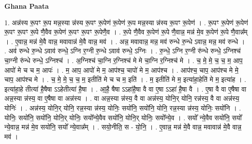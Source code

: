 \documentclass[17pt]{extarticle}
\begin{document}
\textbf{Ghana Paata } \newline

1. अन्न॑स्य रू॒पꣳ रू॒प मन्न॒स्या न्न॑स्य रू॒पꣳ रू॒पेण॑ रू॒पेण॑ रू॒प मन्न॒स्या न्न॑स्य रू॒पꣳ रू॒पेण॑ । . रू॒पꣳ रू॒पेण॑ रू॒पेण॑ रू॒पꣳ रू॒पꣳ रू॒पे णै॒वैव रू॒पेण॑ रू॒पꣳ रू॒पꣳ रू॒पेणै॒व । . रू॒पे णै॒वैव रू॒पेण॑ रू॒पे णै॒वान्न॒ मन्न॑ मे॒व रू॒पेण॑ रू॒पे णै॒वान्न᳚म् । . ए॒वान्न॒ मन्न॑ मे॒वै वान्न॒ मवावान्न॑ मे॒वै वान्न॒ मव॑ । . अन्न॒ मवावान्न॒ मन्न॒ मव॑ रुन्धे रु॒न्धे ऽवान्न॒ मन्न॒ मव॑ रुन्धे । . अव॑ रुन्धे रु॒न्धे ऽवाव॑ रुन्धे॒ ऽग्नि र॒ग्नी रु॒न्धे ऽवाव॑ रुन्धे॒ ऽग्निः । . रु॒न्धे॒ ऽग्नि र॒ग्नी रु॑न्धे रुन्धे॒ ऽग्निश्च॑ चा॒ग्नी रु॑न्धे रुन्धे॒ ऽग्निश्च॑ । . अ॒ग्निश्च॑ चा॒ग्नि र॒ग्निश्च॑ मे मे चा॒ग्नि र॒ग्निश्च॑ मे । . च॒ मे॒ मे॒ च॒ च॒ म॒ आप॒ आपो॑ मे च च म॒ आपः॑ । . म॒ आप॒ आपो॑ मे म॒ आप॑श्च॒ चापो॑ मे म॒ आप॑श्च । . आप॑श्च॒ चाप॒ आप॑श्च मे मे॒ चाप॒ आप॑श्च मे । . च॒ मे॒ मे॒ च॒ च॒ म॒ इतीति॑ मे च च म॒ इति॑ । . म॒ इतीति॑ मे म॒ इत्या॑हा॒हेति॑ मे म॒ इत्या॑ह । . इत्या॑हा॒हे तीत्या॑ है॒षैषा ऽऽहेतीत्या॑ है॒षा । . आ॒है॒ षैषा ऽऽहा॑है॒षा वै वा ए॒षा ऽऽहा॑ है॒षा वै । . ए॒षा वै वा ए॒षैषा वा अन्न॒स्या न्न॑स्य॒ वा ए॒षैषा वा अन्न॑स्य । . वा अन्न॒स्या न्न॑स्य॒ वै वा अन्न॑स्य॒ योनि॒र् योनि॒ रन्न॑स्य॒ वै वा अन्न॑स्य॒ योनिः॑ । . अन्न॑स्य॒ योनि॒र् योनि॒ रन्न॒स्या न्न॑स्य॒ योनिः॒ सयो॑नि॒ सयो॑नि॒ योनि॒ रन्न॒स्या न्न॑स्य॒ योनिः॒ सयो॑नि । . योनिः॒ सयो॑नि॒ सयो॑नि॒ योनि॒र् योनिः॒ सयो᳚न्ये॒वैव सयो॑नि॒ योनि॒र् योनिः॒ सयो᳚न्ये॒व । . सयो᳚ न्ये॒वैव सयो॑नि॒ सयो᳚ न्ये॒वान्न॒ मन्न॑ मे॒व सयो॑नि॒ सयो᳚ न्ये॒वान्न᳚म् । . सयो॒नीति॒ स - यो॒नि॒ । . ए॒वान्न॒ मन्न॑ मे॒वै वान्न॒ मवावान्न॑ मे॒वै वान्न॒ मव॑ । \newline
\end{document}
